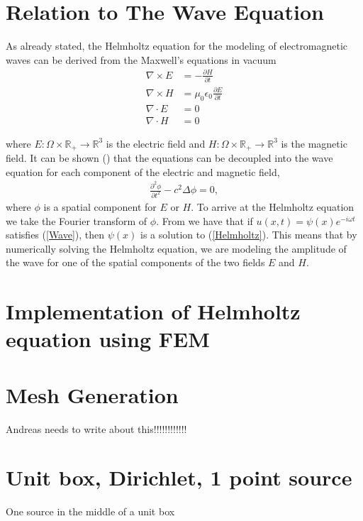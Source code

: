 \documentclass[10pt,a4paper]{article}
\begin{document}
\section*{Relation to The Wave Equation}
As already stated, the Helmholtz equation for the modeling of electromagnetic waves can be derived from the Maxwell's equations in vacuum
\begin{align*}
\nabla \times E &= - \frac{\partial H}{\partial t} \\
\nabla \times H &= \mu_0 \epsilon _0 \frac{\partial E}{\partial t} \\
\nabla \cdot E &= 0 \\
\nabla \cdot H &= 0
\end{align*}

where $E: \Omega \times \mathbb{R}_+ \rightarrow \mathbb{R}^3$ is the electric field and $H: \Omega \times \mathbb{R}_+ \rightarrow \mathbb{R}^3$ is the magnetic field. It can be shown (\cite{Project}) that the equations can be decoupled into the wave equation for each component of the electric and magnetic field,
\begin{equation}
\begin{aligned}
\label{Wave}
\frac{\partial^2 \phi}{\partial t^2} - c^2 \Delta \phi = 0, 
\end{aligned}
\end{equation}
where $\phi$ is a spatial component for $E$ or $H$. To arrive at the Helmholtz equation we take the Fourier transform of $\phi$. From \cite{Helmholtz-Wave} we have that if $u(x,t) = \psi (x)e^{-i \omega t}$ satisfies (\ref{Wave}), then $\psi (x)$ is a solution to (\ref{Helmholtz}). This means that by numerically solving the Helmholtz equation, we are modeling the amplitude of the wave for one of the spatial components of the two fields $E$ and $H$.


\section*{Implementation of Helmholtz equation using FEM}


\section*{Mesh Generation}
Andreas needs to write about this!!!!!!!!!!!!

\section*{Unit box, Dirichlet, 1 point source}
One source in the middle of a unit box
\end{document}
